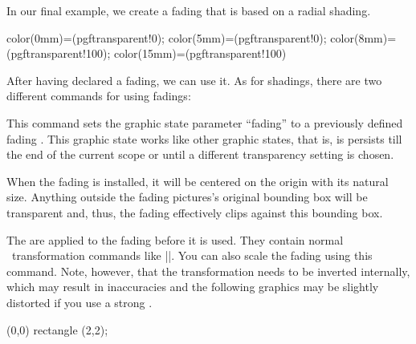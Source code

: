 \begin{command}{\pgfdeclarefading{}}
  In our final example, we create a fading that is based on a radial
  shading.
\begin{codeexample}[]
{
  color(0mm)=(pgftransparent!0);
  color(5mm)=(pgftransparent!0);
  color(8mm)=(pgftransparent!100);
  color(15mm)=(pgftransparent!100)
}
\end{codeexample}
\end{command}

After having declared a fading, we can use it. As for shadings, there
are two different commands for using fadings:

\begin{command}{\pgfsetfading{}}
  This command sets the graphic state parameter ``fading'' to a
  previously defined fading . This graphic state works like
  other graphic states, that is, is persists till the end of the
  current scope or until a different transparency setting is chosen.

  When the fading is installed, it will be centered on the origin with
  its natural size. Anything outside the fading pictures's original
  bounding box will be transparent and, thus, the fading effectively
  clips against this bounding box.

  The  are applied to the fading before it is
  used. They contain normal \pgfname\ transformation commands like
  |\pgftransformshift|. You can also scale the fading using this
  command. Note, however, that the transformation needs to be inverted
  internally, which may result in inaccuracies and the following
  graphics may be slightly distorted if you use a strong
  .
\begin{codeexample}[]
{\tikz \shade[left color=pgftransparent!0,
              right color=pgftransparent!100] (0,0) rectangle (2,2);}
\end{codeexample}
\begin{codeexample}[]
\end{codeexample}
\end{command}

